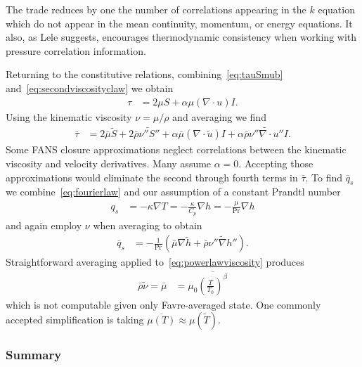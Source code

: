 \documentclass[letterpaper,11pt,nointlimits,reqno]{amsart}
\newcommand{\Prandtl}[1][]{\ensuremath{\mbox{Pr}_{#1}}}
\begin{document}
The trade reduces by one the number of correlations appearing in the $k$
equation which do not appear in the mean continuity, momentum, or energy
equations.  It also, as Lele suggests, encourages thermodynamic consistency
when working with pressure correlation information.

Returning to the constitutive relations, combining~\eqref{eq:tauSmub}
and~\eqref{eq:secondviscosityclaw} we obtain
\begin{align}
  \tau
&= 2 \mu{} S + \alpha \mu \left( \nabla\cdot{}u \right) I.
\end{align}
Using the kinematic viscosity $\nu = \mu / \rho$ and averaging we find
\begin{align}
   \bar{\tau}
&= 2 \bar{\mu}\tilde{S} + 2 \bar{\rho} \widetilde{\nu''S''}
  + \alpha \bar{\mu} \left(\nabla\cdot\tilde{u}\right) I
  + \alpha \bar{\rho} \widetilde{\nu''\nabla\cdot{}u''} I
.
\end{align}
Some FANS closure approximations neglect correlations between the kinematic
viscosity and velocity derivatives.  Many assume $\alpha=0$.  Accepting those
approximations would eliminate the second through fourth terms in $\bar{\tau}$.
To find $\bar{q}_s$ we combine~\eqref{eq:fourierlaw} and our assumption of a
constant Prandtl number
\begin{align}
  q_{s} &= - \kappa \nabla{} T
     = - \frac{\kappa}{C_p} \nabla{}h
     = - \frac{\mu}{\Prandtl} \nabla{}h
\end{align}
and again employ $\nu$ when averaging to obtain
\begin{align}
  \bar{q}_s
&= - \frac{1}{\Prandtl}\left(
                \bar{\mu}\nabla\tilde{h}
              + \bar{\rho} \widetilde{\nu''\nabla{}h''}
            \right)
.
\end{align}
Straightforward averaging applied to~\eqref{eq:powerlawviscosity} produces
\begin{align}
   \bar{\rho}\tilde{\nu}
 = \bar{\mu}
&= \mu_0 \overline{\left(\frac{T}{T_0}\right)^\beta}
\end{align}
which is not computable given only Favre-averaged state.  One commonly accepted
simplification is taking $\overline{\mu\left(T\right)} \approx
\mu\left(\tilde{T}\right)$.

\subsubsection{Summary}
\end{document}
